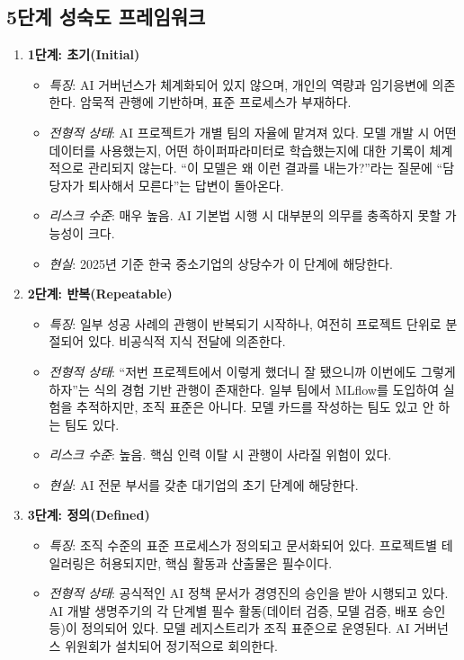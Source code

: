 \subsection{5단계 성숙도 프레임워크}
\begin{enumerate}
 \item \textbf{1단계: 초기(Initial)}
 \begin{itemize}
 \item \textit{특징}: AI 거버넌스가 체계화되어 있지 않으며, 개인의 역량과 임기응변에 의존한다. 암묵적 관행에 기반하며, 표준 프로세스가 부재하다.
 \item \textit{전형적 상태}: AI 프로젝트가 개별 팀의 자율에 맡겨져 있다. 모델 개발 시 어떤 데이터를 사용했는지, 어떤 하이퍼파라미터로 학습했는지에 대한 기록이 체계적으로 관리되지 않는다. ``이 모델은 왜 이런 결과를 내는가?''라는 질문에 ``담당자가 퇴사해서 모른다''는 답변이 돌아온다.
 \item \textit{리스크 수준}: 매우 높음. AI 기본법 시행 시 대부분의 의무를 충족하지 못할 가능성이 크다.
 \item \textit{현실}: 2025년 기준 한국 중소기업의 상당수가 이 단계에 해당한다.
 \end{itemize}
 \item \textbf{2단계: 반복(Repeatable)}
 \begin{itemize}
 \item \textit{특징}: 일부 성공 사례의 관행이 반복되기 시작하나, 여전히 프로젝트 단위로 분절되어 있다. 비공식적 지식 전달에 의존한다.
 \item \textit{전형적 상태}: ``저번 프로젝트에서 이렇게 했더니 잘 됐으니까 이번에도 그렇게 하자''는 식의 경험 기반 관행이 존재한다. 일부 팀에서 MLflow를 도입하여 실험을 추적하지만, 조직 표준은 아니다. 모델 카드를 작성하는 팀도 있고 안 하는 팀도 있다.
 \item \textit{리스크 수준}: 높음. 핵심 인력 이탈 시 관행이 사라질 위험이 있다.
 \item \textit{현실}: AI 전문 부서를 갖춘 대기업의 초기 단계에 해당한다.
 \end{itemize}
 \item \textbf{3단계: 정의(Defined)}
 \begin{itemize}
 \item \textit{특징}: 조직 수준의 표준 프로세스가 정의되고 문서화되어 있다. 프로젝트별 테일러링은 허용되지만, 핵심 활동과 산출물은 필수이다.
 \item \textit{전형적 상태}: 공식적인 AI 정책 문서가 경영진의 승인을 받아 시행되고 있다. AI 개발 생명주기의 각 단계별 필수 활동(데이터 검증, 모델 검증, 배포 승인 등)이 정의되어 있다. 모델 레지스트리가 조직 표준으로 운영된다. AI 거버넌스 위원회가 설치되어 정기적으로 회의한다.

\end{itemize}
\end{enumerate}

